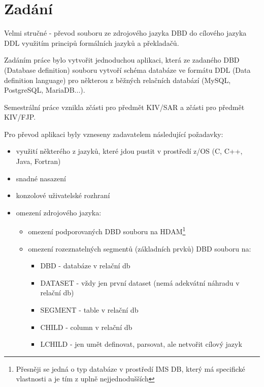 \section{Zadání}

\par Velmi stručné - převod souboru ze zdrojového jazyka DBD do cílového jazyka DDL využitím principů formálních jazyků a překladačů.
\par Zadáním práce bylo vytvořit jednoduchou aplikaci, která ze zadaného DBD (Database definition) souboru vytvoří schéma databáze ve formátu DDL (Data definition language) pro některou z běžných relačních databází (MySQL, PostgreSQL, MariaDB...).

\par Semestrální práce vznikla zčásti pro předmět KIV/SAR a zčásti pro předmět KIV/FJP.

\par Pro převod aplikaci byly vzneseny zadavatelem následující požadavky:
\begin{itemize}
    \item využití některého z jazyků, které jdou pustit v prostředí z/OS (C, C++, Java, Fortran)
    \item snadné nasazení
    \item konzolové uživatelské rozhraní
    \item omezení zdrojového jazyka:
    \begin{itemize}
        \item omezení podporovaných  DBD souboru na HDAM\footnote{Přesněji se jedná o typ databáze v prostředí IMS DB, který má specifické vlastnosti a je tím z uplně nejjednodušších}
        \item omezení rozeznatelných segmentů (základních prvků) DBD souboru na:
        \begin{itemize}
            \item DBD - databáze v relační db
            \item DATASET - vždy jen první dataset (nemá adekvátní náhradu v relační db)
            \item SEGMENT - table v relační db
            \item CHILD - column v relační db
            \item LCHILD - jen umět definovat, parsovat, ale netvořit cílový jazyk
        \end{itemize}
    \end{itemize}
\end{itemize}
\clearpage
